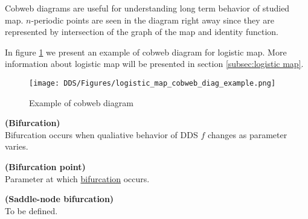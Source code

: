 \begin{remark}
    Cobweb diagrams are useful for understanding long term behavior of studied map.
    $n$-periodic points are seen in the diagram right away since they are represented by intersection of the graph of the map and identity function.
\end{remark}

\begin{example}
    In figure \ref{fig:cobweb_diag_example} we present an example of cobweb diagram for logistic map. More information about logistic map will be presented in section \ref{subsec:logistic map}.
    \begin{figure}[!h]
        \centering
        \texttt{[image: DDS/Figures/logistic\_map\_cobweb\_diag\_example.png]}
        \caption{Example of cobweb diagram}
        \label{fig:cobweb_diag_example}
    \end{figure}
\end{example}

\begin{definition} \textbf{(Bifurcation)} \\
    \label{def:bifurcation}
    Bifurcation occurs when qualiative behavior of DDS $f$ changes as parameter varies.
\end{definition}

\begin{definition} \textbf{(Bifurcation point)} \\
    \label{def:bifurcation_point}
    Parameter at which \hyperref[def:bifurcation]{bifurcation} occurs.
\end{definition}

\begin{definition} \textbf{(Saddle-node bifurcation)} \\
    \label{def:saddle_node_bif}
    To be defined.
\end{definition}


